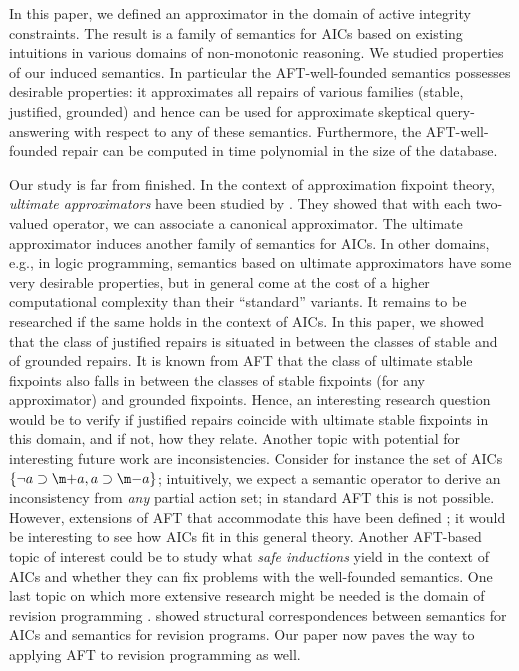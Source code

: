 In this paper, we defined an approximator in the domain of active integrity constraints. 
The result is a family of semantics for AICs based on existing intuitions in various domains of non-monotonic reasoning. 
We studied properties of our induced semantics. 
In particular the AFT-well-founded semantics possesses desirable properties: it approximates all repairs of various families (stable, justified, grounded) and hence can be used for approximate skeptical query-answering with respect to any of these semantics. 
Furthermore, the AFT-well-founded repair can be computed in time polynomial in the size of the database. 

Our study is far from finished. 
In the context of approximation fixpoint theory, \emph{ultimate approximators} have been studied by \citet{DeneckerMT04}. 
They showed that with each two-valued operator, we can associate a canonical approximator. 
The ultimate approximator induces another family of semantics for AICs. 
In other domains, e.g., in logic programming, semantics based on ultimate approximators have some very desirable properties, but in general come at the cost of a higher computational complexity than their ``standard'' variants. 
It remains to be researched if the same holds in the context of AICs. 
In this paper, we showed that the class of justified repairs is situated in between the classes of stable and of grounded repairs. 
It is known from AFT that the class of ultimate stable fixpoints also falls in between the classes of stable fixpoints (for any approximator) and grounded fixpoints. 
Hence, an interesting research question would be to verify if justified repairs coincide with ultimate stable fixpoints in this domain, and if not, how they relate. 
Another topic with potential for interesting future work are inconsistencies. Consider for instance the set of AICs $\{\lnot a \aicrule \add a, a \aicrule \remove a\}$; intuitively, we expect a semantic operator to derive an inconsistency from \emph{any} partial action set; in standard AFT this is not possible. However, extensions of AFT that accommodate this have been defined \cite{RR/BiJF14}; it would be interesting to see how AICs fit in this general theory. 
Another AFT-based topic of interest could be to study what \emph{safe inductions} \cite{ijcai/BogaertsVD17} yield in the context of AICs and whether they can fix problems with the well-founded semantics. 
One last topic on which more extensive research might be needed is the domain of revision programming \cite{tcs/MarekT98}. \citet{tplp/CaropreseT11} showed structural correspondences between semantics for AICs and semantics for revision programs. 
Our paper now paves the way to applying AFT to revision programming as well. 

